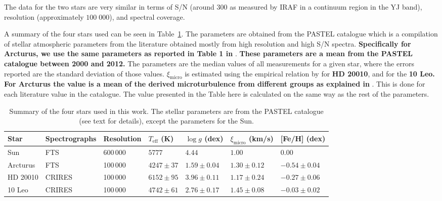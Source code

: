 \documentclass{aa}
\begin{document}
The data for the two stars are very similar in terms of S/N (around 300 as
measured by IRAF in a continuum region in the YJ band), resolution
(approximately $100\;000$), and spectral coverage.

A summary of the four stars used can be seen in Table~\ref{tab:stars}. The parameters are obtained
from the PASTEL catalogue \citep{Soubiran2016} which is a compilation of stellar atmospheric
parameters from the literature obtained mostly from high resolution and high S/N spectra. {\bf
Specifically for Arcturus, we use the same parameters as reported in Table 1 in} \citet{Jofre2014}.
{\bf These parameters are a mean from the PASTEL catalogue between 2000 and 2012.} The parameters
are the median values of all measurements for a given star, where the errors reported are the
standard deviation of those values. $\xi_\mathrm{micro}$ is estimated using the empirical relation
by \citet{Tsantaki2013} for {\bf HD 20010}, and \citet{Adibekyan2015} for the {\bf 10 Leo. For
Arcturus the value is a mean of the derived microturbulence from different groups as explained in}
\citet{Jofre2014}. This is done for each literature value in the catalogue. The value presented in
the Table here is calculated on the same way as the rest of the parameters.

\begin{table}[htb!]
    \caption{Summary of the four stars used in this work. The stellar parameters
             are from the PASTEL catalogue \citep{Soubiran2016} (see text for
             details), except the parameters for the Sun.}
    \label{tab:stars}
    \centering
    \begin{tabular}{lllllll}
      \hline\hline
        Star        & Spectrographs  & Resolution  & $T_\mathrm{eff}$ (K) &  $\log g$ (dex)  &   $\xi_\mathrm{micro}$ (km/s)   & [Fe/H] (dex)      \\
      \hline
        Sun         & FTS            & 600\,000    & $5777$               &  $4.44$          &    $1.00$                       & $ 0.00$          \\
        Arcturus    & FTS            & 100\,000    & $4247 \pm  37$       &  $1.59 \pm 0.04$ &    $1.30 \pm 0.12$              & $-0.54 \pm 0.04$ \\
        HD 20010    & CRIRES         & 100\,000    & $6152 \pm  95$       &  $3.96 \pm 0.11$ &    $1.17 \pm 0.24$              & $-0.27 \pm 0.06$ \\
        10 Leo      & CRIRES         & 100\,000    & $4742 \pm  61$       &  $2.76 \pm 0.17$ &    $1.45 \pm 0.08$              & $-0.03 \pm 0.02$ \\
      \hline
    \end{tabular}
\end{table}
\end{document}
